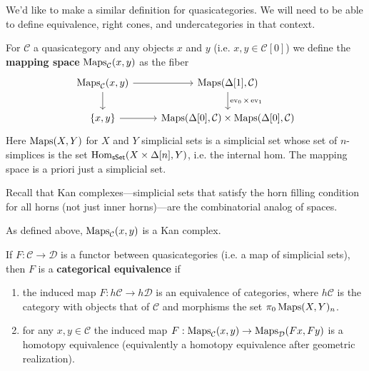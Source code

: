 \documentclass{amsart}
\DeclareMathOperator{\ev}{ev}
\begin{document}
We'd like to make a similar definition for quasicategories. We will need to
be able to define equivalence, right cones, and undercategories in that context.

\begin{definition}
    For $\mathcal{C}$ a quasicategory and any objects $x$ and $y$ (i.e. $x,y\in\mathcal{C}[0]$)
    we define the \textbf{mapping space} $\operatorname{Maps}_\mathcal{C}(x,y)$ as the fiber
    \begin{equation*}
        \begin{tikzcd}
            \Maps_\mathcal{C}(x,y) \dar\rar & \Maps(\Delta[1],\mathcal{C})\dar{\ev_0\times\ev_1} \\
            \{x,y\} \rar & \Maps(\Delta[0],\mathcal{C})\times\Maps(\Delta[0],\mathcal{C})
        \end{tikzcd}
    \end{equation*}
    Here $\operatorname{Maps}(X,Y)$ for $X$ and $Y$ simplicial sets is a simplicial set
    whose set of $n$-simplices is the set $\operatorname{Hom}_{\mathsf{sSet}}(X\times\Delta[n],Y)$,
    i.e. the internal hom. The mapping space is a priori just a simplicial set.
\end{definition}

Recall that Kan complexes---simplicial sets that satisfy the horn filling condition
for all horns (not just inner horns)---are the combinatorial analog of spaces.
\begin{lemma}
    As defined above, $\operatorname{Maps}_\mathcal{C}(x,y)$ is a Kan complex.
\end{lemma}

\begin{definition}
    If $F:\mathcal{C}\to \mathcal{D}$ is a functor between quasicategories
    (i.e. a map of simplicial sets), then $F$ is a \textbf{categorical equivalence}
    if
    \begin{enumerate}
        \item the induced map $F:h\mathcal{C}\to h\mathcal{D}$ is an equivalence
            of categories, where $h\mathcal{C}$ is the category with objects that
            of $\mathcal{C}$ and morphisms the set $\pi_0\operatorname{Maps}(X,Y)_n$.
        \item for any $x,y\in\mathcal{C}$ the induced map $F:\operatorname{Maps}_\mathcal{C}(x,y)\to\operatorname{Maps}_\mathcal{D}(Fx,Fy)$
            is a homotopy equivalence (equivalently a homotopy equivalence after
            geometric realization).
    \end{enumerate}
\end{definition}
\end{document}
